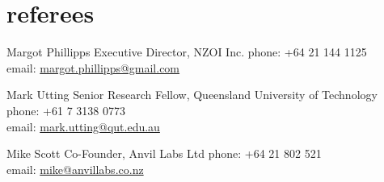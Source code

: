 \documentclass[]{boris-cv}
\begin{document}
\section{referees}

  {Margot Phillipps}
  {Executive Director, NZOI Inc.}
  {phone: +64 21 144 1125
  \\email: \href{mailto:margot.phillipps@gmail.com}{margot.phillipps@gmail.com}}

  {Mark Utting}
  {Senior Research Fellow, Queensland University of Technology}
  {phone: +61 7 3138 0773
  \\email: \href{mailto:mark.utting@qut.edu.au}{mark.utting@qut.edu.au}}

  {Mike Scott}
  {Co-Founder, Anvil Labs Ltd}
  {phone: +64 21 802 521
  \\email: \href{mailto:mike@anvillabs.co.nz}{mike@anvillabs.co.nz}}
\end{document}
